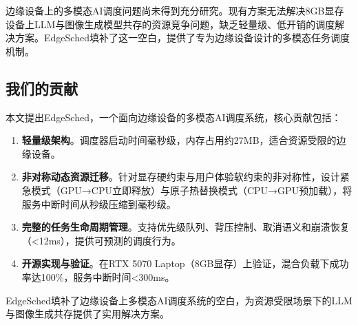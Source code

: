 边缘设备上的多模态AI调度问题尚未得到充分研究。现有方案无法解决8GB显存设备上LLM与图像生成模型共存的资源竞争问题，缺乏轻量级、低开销的调度解决方案。EdgeSched填补了这一空白，提供了专为边缘设备设计的多模态任务调度机制。

\subsection{我们的贡献}

本文提出EdgeSched，一个面向边缘设备的多模态AI调度系统，核心贡献包括：

\begin{enumerate}
\item \textbf{轻量级架构}。调度器启动时间毫秒级，内存占用约27MB，适合资源受限的边缘设备。

\item \textbf{非对称动态资源迁移}。针对显存硬约束与用户体验软约束的非对称性，设计紧急模式（GPU→CPU立即释放）与原子热替换模式（CPU→GPU预加载），将服务中断时间从秒级压缩到毫秒级。

\item \textbf{完整的任务生命周期管理}。支持优先级队列、背压控制、取消语义和崩溃恢复（<12ms），提供可预测的调度行为。

\item \textbf{开源实现与验证}。在RTX 5070 Laptop（8GB显存）上验证，混合负载下成功率达100\%，服务中断时间<300ms。
\end{enumerate}

EdgeSched填补了边缘设备上多模态AI调度系统的空白，为资源受限场景下的LLM与图像生成共存提供了实用解决方案。
